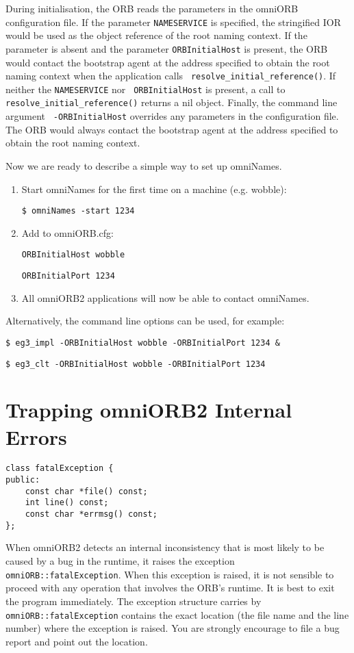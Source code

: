 \documentclass[11pt,twoside,onecolumn]{book}
\begin{document}
During initialisation, the ORB reads the parameters in the omniORB
configuration file. If the parameter {\tt NAMESERVICE} is specified, the
stringified IOR would be used as the object reference of the root naming
context. If the parameter is absent and the parameter {\tt ORBInitialHost}
is present, the ORB would contact the bootstrap agent at the address
specified to obtain the root naming context when the application calls {\tt
resolve\_initial\_reference()}. If neither the {\tt NAMESERVICE} nor {\tt
ORBInitialHost} is present, a call to {\tt resolve\_initial\_reference()}
returns a nil object. Finally, the command line argument {\tt
-ORBInitialHost} overrides any parameters in the configuration file. The
ORB would always contact the bootstrap agent at the address specified to
obtain the root naming context.

Now we are ready to describe a simple way to set up omniNames.

\begin{enumerate}
\item Start omniNames for the first time on a machine (e.g. wobble):

{\tt \$ omniNames -start 1234}

\item Add to omniORB.cfg:

{\tt ORBInitialHost wobble}

{\tt ORBInitialPort 1234}

\item All omniORB2 applications will now be able to contact omniNames.

\end{enumerate}

Alternatively, the command line options can be used, for example:

{\tt \$ eg3\_impl -ORBInitialHost wobble -ORBInitialPort 1234 \&}

{\tt \$ eg3\_clt -ORBInitialHost wobble -ORBInitialPort 1234}


\section{Trapping omniORB2 Internal Errors}

{\small
\begin{verbatim}
class fatalException {
public:
    const char *file() const;
    int line() const;
    const char *errmsg() const;
};
\end{verbatim}
}

When omniORB2 detects an internal inconsistency that is most likely to be
caused by a bug in the runtime, it raises the exception {\tt
omniORB::fatalException}.  When this exception is raised, it is not
sensible to proceed with any operation that involves the ORB's runtime. It
is best to exit the program immediately. The exception structure carries by
{\tt omniORB::fatalException} contains the exact location (the file name
and the line number) where the exception is raised. You are strongly
encourage to file a bug report and point out the location.
\end{document}
